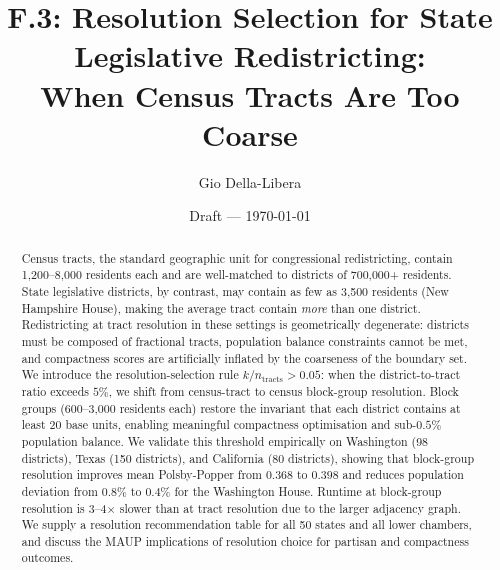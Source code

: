 \documentclass[12pt]{article}
\title{F.3: Resolution Selection for State Legislative Redistricting:\\
       When Census Tracts Are Too Coarse}
\author{Gio Della-Libera}
\date{Draft --- \today}
\begin{document}
\maketitle

\begin{abstract}
Census tracts, the standard geographic unit for congressional redistricting,
contain 1,200--8,000 residents each and are well-matched to districts of
700,000+ residents. State legislative districts, by contrast, may contain
as few as 3,500 residents (New Hampshire House), making the average tract
contain \emph{more} than one district. Redistricting at tract resolution
in these settings is geometrically degenerate: districts must be composed
of fractional tracts, population balance constraints cannot be met, and
compactness scores are artificially inflated by the coarseness of the
boundary set.
We introduce the resolution-selection rule $k/n_{\mathrm{tracts}} > 0.05$:
when the district-to-tract ratio exceeds $5\%$, we shift from census-tract
to census block-group resolution. Block groups (600--3,000 residents each)
restore the invariant that each district contains at least 20 base units,
enabling meaningful compactness optimisation and sub-$0.5\%$ population balance.
We validate this threshold empirically on Washington (98 districts),
Texas (150 districts), and California (80 districts), showing that
block-group resolution improves mean Polsby-Popper from $0.368$ to $0.398$
and reduces population deviation from $0.8\%$ to $0.4\%$ for the Washington
House. Runtime at block-group resolution is 3--4$\times$ slower than at
tract resolution due to the larger adjacency graph.
We supply a resolution recommendation table for all 50 states and all
lower chambers, and discuss the MAUP implications of resolution choice
for partisan and compactness outcomes.
\end{abstract}












\end{document}
